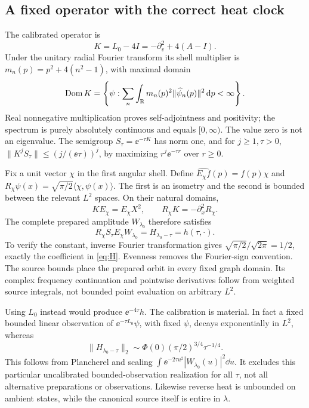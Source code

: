 \subsection{A fixed operator with the correct heat clock}
The calibrated operator is
\begin{equation}\label{eq:calibrated-K}
 K=L_0-4I=-\partial_v^2+4(A-I).
\end{equation}
Under the unitary radial Fourier transform its shell multiplier is
\(m_n(p)=p^2+4(n^2-1)\), with maximal domain
\[
 \operatorname{Dom} K=\left\{\psi:\sum_n\int_\mathbb R m_n(p)^2
             \|\widehat\psi_n(p)\|^2\,\mathrm d p<\infty\right\}.
\]
Real nonnegative multiplication proves self-adjointness and positivity;
the spectrum is purely absolutely continuous and equals \([0,\infty)\).
The value zero is not an eigenvalue. The semigroup \(S_\tau=\ee^{-\tau K}\)
has norm one, and for \(j\ge1,\tau>0\),
\(\|K^jS_\tau\|\le(j/(\ee\tau))^j\), by maximizing
\(r^j\ee^{-\tau r}\) over \(r\ge0\).

Fix a unit vector \(\chi\) in the first angular shell. Define
\(\widehat{E_\chi f}(p)=f(p)\chi\) and
\(R_\chi\psi(x)=\sqrt{\pi/2}\langle\chi,\psi(x)\rangle\).
The first is an isometry and the second is bounded between the relevant
\(L^2\) spaces. On their natural domains,
\begin{equation}\label{eq:operator-intertwine}
 KE_\chi=E_\chi X^2,\qquad R_\chi K=-\partial_x^2R_\chi.
\end{equation}
The complete prepared amplitude \(W_{\lambda_0}\) therefore satisfies
\begin{equation}\label{eq:operator-response}
 R_\chi S_\tau E_\chi W_{\lambda_0}=H_{\lambda_0-\tau}=h(\tau,\cdot).
\end{equation}
To verify the constant, inverse Fourier transformation gives
\(\sqrt{\pi/2}/\sqrt{2\pi}=1/2\), exactly the coefficient in
\eqref{eq:H}. Evenness removes the Fourier-sign convention. The source
bounds place the prepared orbit in every fixed graph domain. Its complex
frequency continuation and pointwise derivatives follow from weighted
source integrals, not bounded point evaluation on arbitrary \(L^2\).

Using \(L_0\) instead would produce \(\ee^{-4\tau}h\). The calibration
is material. In fact a fixed bounded linear observation of
\(\ee^{-\tau L_0}\psi\), with fixed \(\psi\), decays exponentially in
\(L^2\), whereas
\[
 \|H_{\lambda_0-\tau}\|_2
 \sim\Phi(0)(\pi/2)^{3/4}\tau^{-1/4}.
\]
This follows from Plancherel and scaling
\(\int\ee^{-2\tau u^2}|W_{\lambda_0}(u)|^2\dd u\).
It excludes this particular uncalibrated bounded-observation realization
for all \(\tau\), not all alternative preparations or observations.
Likewise reverse heat is unbounded on ambient states, while the
canonical source itself is entire in \(\lambda\).

